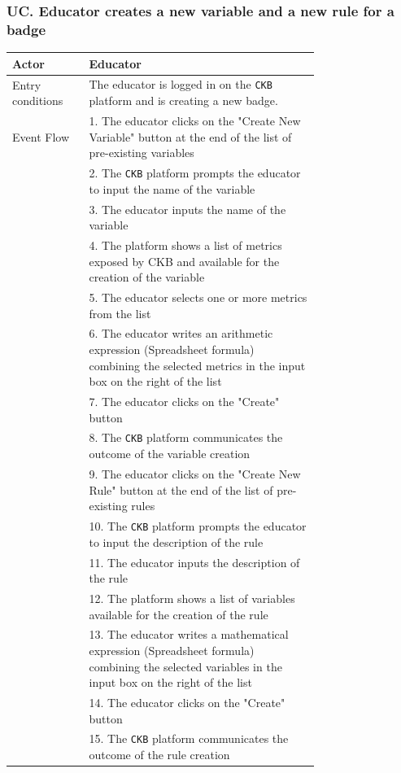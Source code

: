 \subsubsection*{UC\cuc . Educator creates a new variable and a new rule for a badge}
\begin{center}
    \begin{longtable}{lp{0.75\linewidth}}
        \hline
        Actor            & Educator \\
        \hline
        Entry conditions & The educator is logged in on the \verb|CKB| platform and is creating a new badge.\\
        \hline
        Event Flow      
        & 1. The educator clicks on the "Create New Variable" button at the end of the list of pre-existing variables\\
        & 2. The \verb|CKB| platform prompts the educator to input the name of the variable\\
        & 3. The educator inputs the name of the variable\\
        & 4. The platform shows a list of metrics exposed by CKB and available for the creation of the variable\\
        & 5. The educator selects one or more metrics from the list\\
        & 6. The educator writes an arithmetic expression (Spreadsheet formula) combining the selected metrics in the input box on the right of the list\\
        & 7. The educator clicks on the "Create" button\\
        & 8. The \verb|CKB| platform communicates the outcome of the variable creation\\
        & 9. The educator clicks on the "Create New Rule" button at the end of the list of pre-existing rules\\
        & 10. The \verb|CKB| platform prompts the educator to input the description of the rule\\
        & 11. The educator inputs the description of the rule\\
        & 12. The platform shows a list of variables available for the creation of the rule\\
        & 13. The educator writes a mathematical expression (Spreadsheet formula) combining the selected variables in the input box on the right of the list\\
        & 14. The educator clicks on the "Create" button\\
        & 15. The \verb|CKB| platform communicates the outcome of the rule creation\\

\end{longtable}
\end{center}
